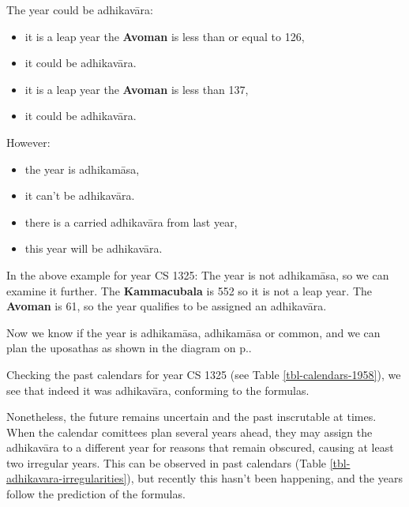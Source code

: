 \documentclass[11pt,oneside]{memoir-article}
\begin{document}
The year could be adhikavāra:

\begin{itemize}
\item {} it is a leap year  the \textbf{Avoman} is less than or equal to 126,
\item {} it could be adhikavāra.
\item {} it is  a leap year  the \textbf{Avoman} is less than 137,
\item {} it could be adhikavāra.
\end{itemize}


However:

\begin{itemize}
\item {} the year is adhikamāsa,
\item {} it can't be adhikavāra.
\item {} there is a carried adhikavāra from last year,
\item {} this year will be adhikavāra.
\end{itemize}

In the above example for year CS 1325: The year is not adhikamāsa, so we can
examine it further. The \textbf{Kammacubala} is 552 so it is not a leap year. The
\textbf{Avoman} is 61, so the year qualifies to be assigned an adhikavāra.

Now we know if the year is adhikamāsa, adhikamāsa or common, and we can plan the
uposathas as shown in the diagram on
p.\pageref{dia-common-adhikamasa-adhikavara}.

Checking the past calendars for year CS 1325 (see Table
\ref{tbl-calendars-1958}), we see that indeed it was adhikavāra, conforming to
the formulas.

Nonetheless, the future remains uncertain and the past inscrutable at times.
When the calendar comittees plan several years ahead, they may assign the
adhikavāra to a different year for reasons that remain obscured, causing at
least two irregular years. This can be observed in past calendars (Table
\ref{tbl-adhikavara-irregularities}), but recently this hasn't been happening,
and the years follow the prediction of the formulas.
\end{document}
